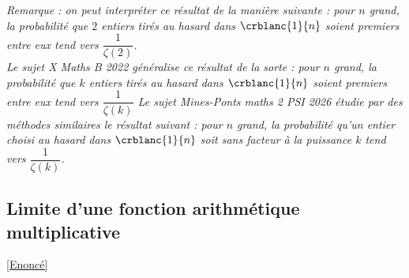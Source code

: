 \documentclass[8pt]{book}
\begin{document}
\begin{enumerate}[leftmargin=*]
		\textit{Remarque : on peut interpréter ce résultat de la manière suivante : pour $n$ grand, la probabilité que $2$ entiers tirés au hasard dans $\crblanc{1}{n}$ soient premiers entre eux tend vers $\dfrac{1}{\zeta(2)}$.\\
		Le sujet X Maths B 2022 généralise ce résultat de la sorte : pour $n$ grand, la probabilité que $k$ entiers tirés au hasard dans $\crblanc{1}{n}$ soient premiers entre eux tend vers $\dfrac{1}{\zeta(k)}$
		Le sujet Mines-Ponts maths 2 PSI 2026 étudie par des méthodes similaires le résultat suivant : pour $n$ grand, la probabilité qu'un entier choisi au hasard dans $\crblanc{1}{n}$ soit sans facteur à la puissance $k$ tend vers $\dfrac{1}{\zeta(k)}$.}
	\end{enumerate}
	
	\subsection{Limite d'une fonction arithmétique multiplicative }
	\label{Limite d'une fonction arithmétique multiplicative corrigé}
	\textcolor{blue}{\hyperref[Limite d'une fonction arithmétique multiplicative]{[Enoncé]}}\\
\end{document}
